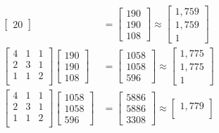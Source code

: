 \documentclass{article}
\begin{document}
\begin{align}
\begin{bmatrix}
        20
    \end{bmatrix}
    &=
    \begin{bmatrix}
        190\\
        190\\
        108
    \end{bmatrix}
    \approx
    \begin{bmatrix}
        1,759\\
        1,759\\
        1
    \end{bmatrix}\\
        \begin{bmatrix}
        4 & 1 & 1\\
        2 & 3 & 1\\
        1 & 1 & 2\\
    \end{bmatrix}
    \begin{bmatrix}
        190\\
        190\\
        108
    \end{bmatrix}
    &=
    \begin{bmatrix}
        1058\\
        1058\\
        596
    \end{bmatrix}
    \approx
    \begin{bmatrix}
        1,775\\
        1,775\\
        1
    \end{bmatrix}\\
        \begin{bmatrix}
        4 & 1 & 1\\
        2 & 3 & 1\\
        1 & 1 & 2\\
    \end{bmatrix}
    \begin{bmatrix}
        1058\\
        1058\\
        596
    \end{bmatrix}
    &=
    \begin{bmatrix}
        5886\\
        5886\\
        3308
    \end{bmatrix}
    \approx
    \begin{bmatrix}
        1,779\\

\end{bmatrix}
\end{align}
\end{document}
